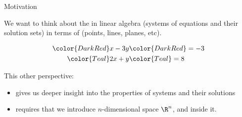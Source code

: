 \begin{frame}{Motivation}

    We want to think about the  in linear algebra (systems of
    equations and their solution sets) in terms of  (points, lines,
    planes, etc).
    
    \pause 
    \vspace{12pt}
    
        \begin{minipage}{.52\textwidth}
    
        \begin{align*} 
            \color{DarkRed} x - 3y & \color{DarkRed} = -3\\
            \color{Teal} 2x + y & \color{Teal} = 8 
        \end{align*}
    
            \end{minipage} \begin{minipage}{.46\textwidth}
    
        \end{minipage} 
    
    \vspace{12pt}
    
    This other perspective:
    \begin{itemize}
        \item gives us deeper insight into the properties of systems and their solutions
        \item requires that we introduce $n$-dimensional space $\R^n$, and
     inside it.
    \end{itemize}


\end{frame}





